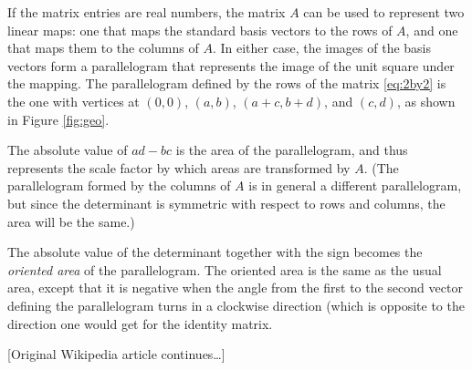 If the matrix entries are real numbers, the matrix $A$ can be used to
represent two linear maps: one that maps the standard basis vectors to
the rows of $A$, and one that maps them to the columns of $A$. In
either case, the images of the basis vectors form a parallelogram that
represents the image of the unit square under the mapping. The
parallelogram defined by the rows of the matrix \eqref{eq:2by2} is the
one with vertices at $(0, 0)$, $(a, b)$, $(a+c, b+d)$, and $(c, d)$,
as shown in Figure \ref{fig:geo}.

The absolute value of $ad - bc$ is the area of the parallelogram, and
thus represents the scale factor by which areas are transformed by
$A$. (The parallelogram formed by the columns of $A$ is in general a
different parallelogram, but since the determinant is symmetric with
respect to rows and columns, the area will be the same.)

The absolute value of the determinant together with the sign becomes
the \emph{oriented area} of the parallelogram. The oriented area is
the same as the usual area, except that it is negative when the angle
from the first to the second vector defining the parallelogram turns
in a clockwise direction (which is opposite to the direction one would
get for the identity matrix.

[Original Wikipedia article continues\ldots]
